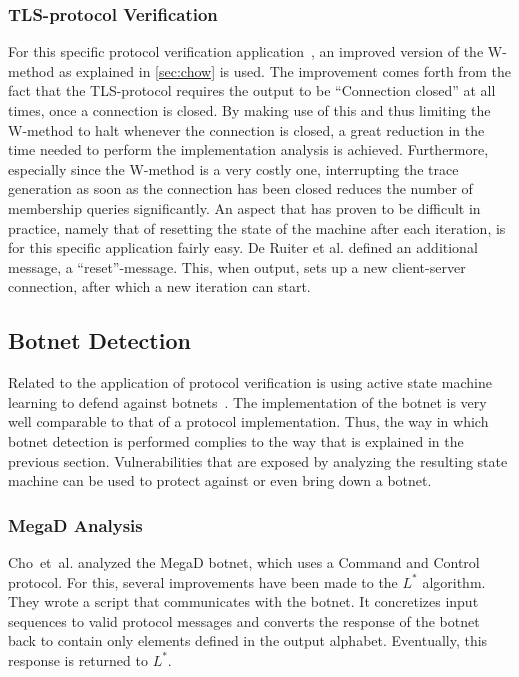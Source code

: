 \documentclass[multi,crop=false,class=article]{standalone}
\begin{document}
\subsubsection{TLS-protocol Verification} For this specific protocol verification
application~\cite{deRuiter2015}, an improved version of the W-method as explained
in \cref{sec:chow} is used. The improvement comes forth from the fact that the
TLS-protocol requires the output to be ``Connection closed'' at all times, once
a connection is closed. By making use of this and thus limiting the W-method to
halt whenever the connection is closed, a great reduction in the time needed to
perform the implementation analysis is achieved. Furthermore, especially since
the W-method is a very costly one, interrupting the trace generation as soon as
the connection has been closed reduces the number of membership queries
significantly. An aspect that has proven to be difficult in practice, namely
that of resetting the state of the machine after each iteration, is for this
specific application fairly easy. De Ruiter et al. defined an additional
message, a ``reset''-message. This, when output, sets up a new client-server
connection, after which a new iteration can start.

\subsection{Botnet Detection}
Related to the application of protocol verification is using active state
machine learning to defend against botnets~\cite{Cho2010}. The implementation of
the botnet is very well comparable to that of a protocol implementation. Thus,
the way in which botnet detection is performed complies to the way that is
explained in the previous section. Vulnerabilities that are exposed by analyzing
the resulting state machine can be used to protect against or even bring down a
botnet.

\subsubsection{MegaD Analysis}
Cho~et~al. analyzed the MegaD botnet, which uses a Command and Control protocol.
For this, several improvements have been made to the $L^*$ algorithm.
They wrote a script that communicates with the botnet. It concretizes input
sequences to valid protocol messages and converts the response of the botnet
back to contain only elements defined in the output alphabet. Eventually, this
response is returned to $L^*$.
\end{document}
